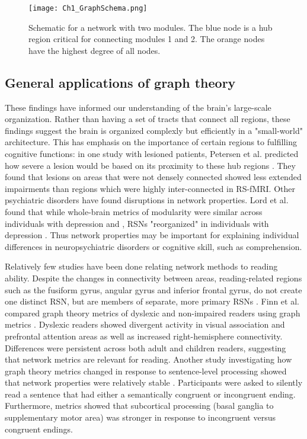 \begin{figure}[t]
    \centering
    \texttt{[image: Ch1\_GraphSchema.png]}
    \caption[Schematic for a network with two modules.]{Schematic for a network with two modules. The blue node is a hub region critical for connecting modules 1 and 2. The orange nodes have the highest degree of all nodes.}
\end{figure}

\subsection{General applications of graph theory}

These findings have informed our understanding of the brain's large-scale organization. Rather than having a set of tracts that connect all regions, these findings suggest the brain is organized complexly but efficiently in a "small-world" architecture. This has emphasis on the importance of certain regions to fulfilling cognitive functions: in one study with lesioned patients, Petersen et al. predicted how severe a lesion would be based on its proximity to these hub regions \cite{Warren2014}. They found that lesions on areas that were not densely connected showed less extended impairments than regions which were highly inter-connected in RS-fMRI. Other psychiatric disorders have found disruptions in network properties. Lord et al. found that while whole-brain metrics of modularity were similar across individuals with depression and , RSNs "reorganized" in individuals with depression \cite{Lord2012}. Thus network properties may be important for explaining individual differences in neuropsychiatric disorders or cognitive skill, such as comprehension. 

Relatively few studies have been done relating network methods to reading ability. Despite the changes in connectivity between areas, reading-related regions such as the fusiform gyrus, angular gyrus and inferior frontal gyrus, do not create one distinct RSN, but are members of separate, more primary RSNs \cite{Vogel2013}. Finn et al. compared graph theory metrics of dyslexic and non-impaired readers using graph metrics \cite{Finn2014}. Dyslexic readers showed divergent activity in visual association and prefrontal attention areas as well as increased right-hemisphere connectivity. Differences were persistent across both adult and children readers, suggesting that network metrics are relevant for reading. Another study investigating how graph theory metrics changed in response to sentence-level processing showed that network properties were relatively stable \cite{Ye2012}. Participants were asked to silently read a sentence that had either a semantically congruent or incongruent ending. Furthermore, metrics showed that subcortical processing (basal ganglia to supplementary motor area) was stronger in response to incongruent versus congruent endings. 

